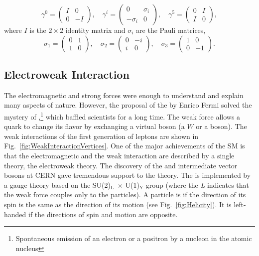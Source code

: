 \begin{equation*}
 \gamma^{0}=\left(
\begin{array}{ccc}
I & 0\\
0 & -I
\end{array}
\right),\quad
\gamma^{i}=\left(
\begin{array}{ccc}
0 & \sigma_{i}\\
-\sigma_{i} & 0
\end{array}
\right),\quad
\gamma^{5}=\left(
\begin{array}{ccc}
0 & I\\
I & 0
\end{array}
\right),
\end{equation*}
where $I$ is the $2\times2$ identity matrix and $\sigma_{i}$ are the Pauli matrices,
\begin{equation*}
 \sigma_{1}=\left(
\begin{array}{ccc}
0 & 1\\
1 & 0
\end{array}
\right),\quad
\sigma_{2}=\left(
\begin{array}{ccc}
0 & -i\\
i & 0
\end{array}
\right),\quad
\sigma_{3}=\left(
\begin{array}{ccc}
1 & 0\\
0 & -1
\end{array}
\right).
\end{equation*}

\subsection{Electroweak Interaction}
The electromagnetic and strong forces were enough to understand and explain many aspects of nature. However, the proposal of the  by Enrico Fermi solved the mystery of ,\footnote{Spontaneous emission of an electron or a positron by a nucleon in the atomic nucleus} which baffled scientists for a long time. The weak force allows a quark to change its flavor by exchanging a virtual boson (a $W$ or a \Z boson). The weak interactions of the first generation of leptons are shown in Fig.~\ref{fig:WeakInteractionVertices}. One of the major achievements of the SM is that the electromagnetic and the weak interaction are described by a single theory, the electroweak theory. The discovery of the \W and \Z intermediate vector bosons at CERN gave tremendous support to the theory. The  is implemented by a gauge theory based on the SU(2)$_\mathrm{L}$~$\times$ U(1)$_\mathrm{Y}$ group (where the \textit{L} indicates that the weak force couples only to the  particles). A particle is  if the direction of its spin is the same as the direction of its motion (see Fig.~\ref{fig:Helicity}). It is left-handed if the directions of spin and motion are opposite. %

